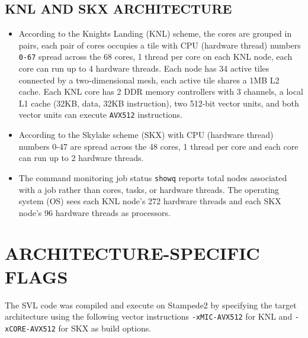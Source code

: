\documentclass{article}
\begin{document}
\subsection{KNL AND SKX ARCHITECTURE}
\begin{itemize}
\item According to the Knights Landing (KNL) scheme, the cores are grouped in pairs,
each pair of cores occupies a tile with CPU (hardware thread) numbers \verb+0-67+ spread across the 68 cores,
1 thread per core on each KNL node, each core can run up to 4 hardware threads.
Each node has 34 active tiles connected by a two-dimensional mesh, each active tile shares a 1MB L2 cache.
Each KNL core has 2 DDR memory controllers with 3 channels, a local L1 cache (32KB, data, 32KB instruction), two 512-bit vector units, and both vector units can execute \verb+AVX512+ instructions\cite{TACC_Stampede2}.
\item According to the Skylake scheme (SKX) with CPU (hardware thread) numbers 0-47 are spread across the 48 cores,
1 thread per core and each core can run up to 2 hardware threads\cite{TACC_Stampede2}.
\item The command monitoring job status \verb+showq+ reports total nodes associated with a job rather than cores, tasks, or hardware threads.
The operating system (OS) sees each KNL node's 272 hardware threads and each SKX node's 96 hardware threads as processors\cite{TACC_Stampede2}.
\end{itemize}

\section{ARCHITECTURE-SPECIFIC FLAGS}
The SVL code was compiled and execute on Stampede2 by specifying the target architecture using the following vector instructions
\verb+-xMIC-AVX512+ for KNL and \verb+-xCORE-AVX512+ for SKX as build options\cite{TACC_Stampede2}.
\end{document}
